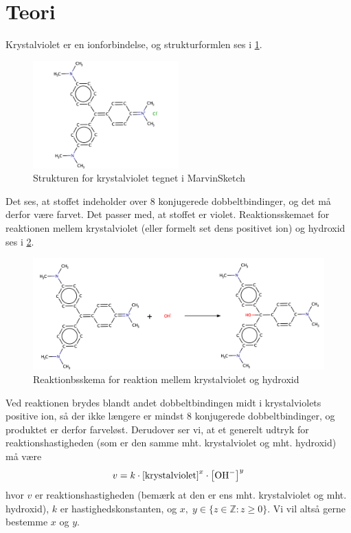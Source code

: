 \documentclass{report}
\begin{document}
\section*{Teori}
Krystalviolet er en ionforbindelse, og strukturformlen ses i \cref{fig:krystalviolet}.
\begin{figure}[H]
\begin{center}
  \includegraphics[width=0.5\textwidth]{krystalviolet.png}
\end{center}
\caption{Strukturen for krystalviolet tegnet i MarvinSketch}
\label{fig:krystalviolet}
\end{figure}
Det ses, at stoffet indeholder over 8 konjugerede dobbeltbindinger, og det må derfor være farvet.
Det passer med, at stoffet er violet.
Reaktionsskemaet for reaktionen mellem krystalviolet (eller formelt set dens positivet ion) og hydroxid ses i \cref{fig:reaktion}.
\begin{figure}[H]
\begin{center}
  \includegraphics[width=\textwidth]{reaktion.png}
\end{center}
\caption{Reaktionbsskema for reaktion mellem krystalviolet og hydroxid}
\label{fig:reaktion}
\end{figure}
Ved reaktionen brydes blandt andet dobbeltbindingen midt i krystalviolets positive ion, så der ikke længere er mindst 8 konjugerede dobbeltbindinger, og produktet er derfor farveløst.
Derudover ser vi, at et generelt udtryk for reaktionshastigheden (som er den samme mht. krystalviolet og mht. hydroxid) må være
\[
v=k \cdot \left[\text{krystalviolet} \right] ^{x} \cdot \left[\ce{OH-} \right] ^{y}
\] 
hvor $v$ er reaktionshastigheden (bemærk at den er ens mht. krystalviolet og mht. hydroxid), $k$ er hastighedskonstanten, og $x,\;y \in \{z \in \mathbb{Z}: z \geq 0\}$.
Vi vil altså gerne bestemme $x$ og $y$. 
\end{document}
